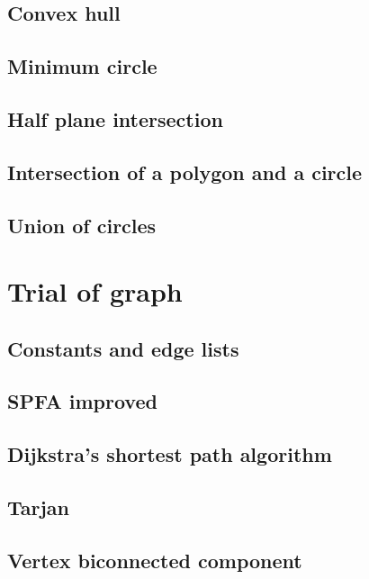 \documentclass[UTF8,a4paper]{report}
\begin{document}
		\section{Convex hull}
			
		\section{Minimum circle}
			
		\section{Half plane intersection}
			
		\section{Intersection of a polygon and a circle}
			
		\section{Union of circles}	
			
	\chapter{Trial of graph}
		\section{Constants and edge lists}
			
		\section{SPFA improved}
			
		\section{Dijkstra's shortest path algorithm}
			
		\section{Tarjan}
			
		\section{Vertex biconnected component}
			
\end{document}
